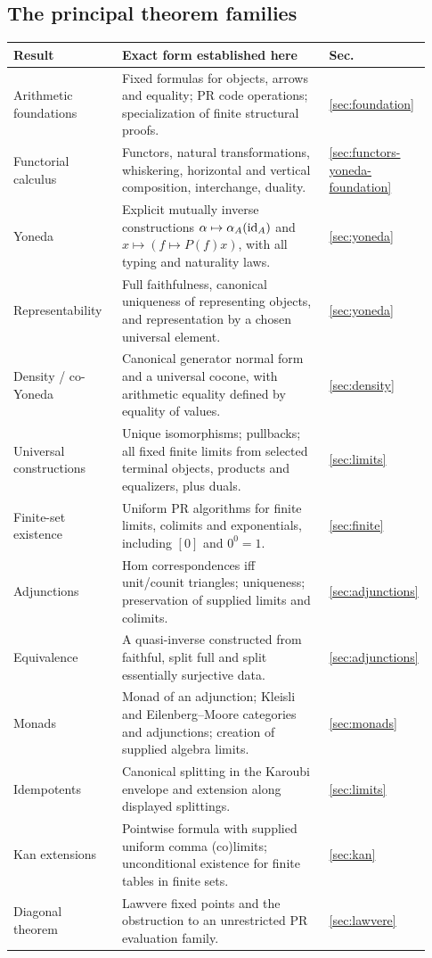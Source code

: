 \subsection{The principal theorem families}
\begin{longtable}{@{}>{\raggedright\arraybackslash}p{0.27\linewidth}>{\raggedright\arraybackslash}p{0.60\linewidth}p{0.06\linewidth}@{}}
\toprule
Result & Exact form established here & Sec.\\
\midrule
\endhead
Arithmetic foundations & Fixed formulas for objects, arrows and equality;
PR code operations; specialization of finite structural proofs. &
\ref{sec:foundation}\\
Functorial calculus & Functors, natural transformations, whiskering,
horizontal and vertical composition, interchange, duality. &
\ref{sec:functors-yoneda-foundation}\\
Yoneda & Explicit mutually inverse constructions
$\alpha\mapsto\alpha_A(\operatorname{id}_A)$ and $x\mapsto(f\mapsto P(f)x)$,
with all typing and naturality laws. & \ref{sec:yoneda}\\
Representability & Full faithfulness, canonical uniqueness of representing
objects, and representation by a chosen universal element. &
\ref{sec:yoneda}\\
Density / co-Yoneda & Canonical generator normal form and a universal
cocone, with arithmetic equality defined by equality of values. &
\ref{sec:density}\\
Universal constructions & Unique isomorphisms; pullbacks; all fixed finite
limits from selected terminal objects, products and equalizers, plus duals. &
\ref{sec:limits}\\
Finite-set existence & Uniform PR algorithms for finite limits, colimits
and exponentials, including $[0]$ and $0^0=1$. & \ref{sec:finite}\\
Adjunctions & Hom correspondences iff unit/counit triangles; uniqueness;
preservation of supplied limits and colimits. & \ref{sec:adjunctions}\\
Equivalence & A quasi-inverse constructed from faithful, split full and
split essentially surjective data. & \ref{sec:adjunctions}\\
Monads & Monad of an adjunction; Kleisli and Eilenberg--Moore categories
and adjunctions; creation of supplied algebra limits. & \ref{sec:monads}\\
Idempotents & Canonical splitting in the Karoubi envelope and extension
along displayed splittings. & \ref{sec:limits}\\
Kan extensions & Pointwise formula with supplied uniform comma
(co)limits; unconditional existence for finite tables in finite sets. &
\ref{sec:kan}\\
Diagonal theorem & Lawvere fixed points and the obstruction to an
unrestricted PR evaluation family. & \ref{sec:lawvere}\\
\bottomrule
\end{longtable}

